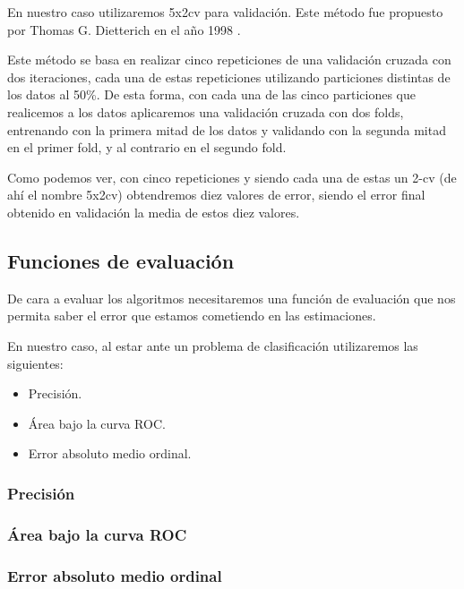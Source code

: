En nuestro caso utilizaremos 5x2cv para validación. Este método fue propuesto por Thomas G. Dietterich en el año 1998 \cite{propuesta5x2cv}.

Este método se basa en realizar cinco repeticiones de una validación cruzada con dos iteraciones, cada una de estas repeticiones utilizando particiones distintas de los datos al 50\%. De esta forma, con cada una de las cinco particiones que realicemos a los datos aplicaremos una validación cruzada con dos folds, entrenando con la primera mitad de los datos y validando con la segunda mitad en el primer fold, y al contrario en el segundo fold.

Como podemos ver, con cinco repeticiones y siendo cada una de estas un 2-cv (de ahí el nombre 5x2cv) obtendremos diez valores de error, siendo el error final obtenido en validación la media de estos diez valores.



\newpage

\subsection{Funciones de evaluación}

De cara a evaluar los algoritmos necesitaremos una función de evaluación que nos permita saber el error que estamos cometiendo en las estimaciones.

En nuestro caso, al estar ante un problema de clasificación utilizaremos las siguientes:

\begin{itemize}
	\item Precisión.
	\item Área bajo la curva ROC.
	\item Error absoluto medio ordinal.
\end{itemize}

\subsubsection{Precisión}


\subsubsection{Área bajo la curva ROC}


\subsubsection{Error absoluto medio ordinal}



\newpage
